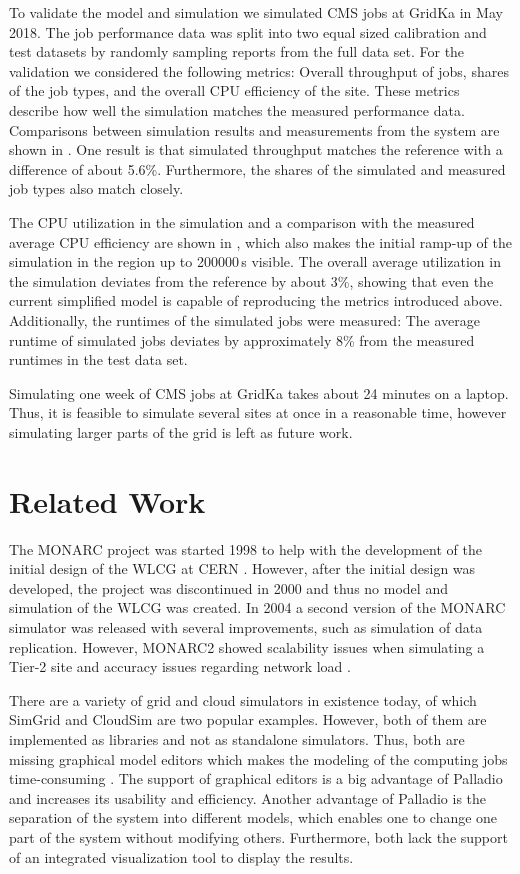 \documentclass{webofc}
\begin{document}
\vspace{10px}
\noindent To validate the model and simulation we simulated CMS jobs at GridKa in May 2018.
The job performance data was split into two equal sized calibration and test datasets by randomly sampling reports from the full data set.
For the validation we considered the following metrics: Overall throughput of jobs, shares of the job types, and the overall CPU efficiency of the site.
These metrics describe how well the simulation matches the measured performance data.
Comparisons between simulation results and measurements from the system are shown in .
One result is that simulated throughput matches the reference with a difference of about 5.6\%.
Furthermore, the shares of the simulated and measured job types also match closely.

The CPU utilization in the simulation and a comparison with the measured average CPU efficiency are shown in , which also makes the initial ramp-up of the simulation in the region up to 200000\,s visible.
The overall average utilization in the simulation deviates from the reference by about 3\%, showing that even the current simplified model is capable of reproducing the metrics introduced above.
Additionally, the runtimes of the simulated jobs were measured: The average runtime of simulated jobs deviates by approximately 8\% from the measured runtimes in the test data set.

Simulating one week of CMS jobs at GridKa takes about 24 minutes on a laptop.
Thus, it is feasible to simulate several sites at once in a reasonable time, however simulating larger parts of the grid is left as future work.

\section{Related Work}
\label{related}
The MONARC project was started 1998 to help with the development of the initial design of the WLCG at CERN \cite{monarc2000models}.
However, after the initial design was developed, the project was discontinued in 2000 and thus no model and simulation of the WLCG was created. 
In 2004 a second version of the MONARC simulator was released with several improvements, such as simulation of data replication. However, MONARC2 showed scalability issues when simulating a Tier-2 site and accuracy issues regarding network load \cite{1742-6596-331-7-072038}.

There are a variety of grid and cloud simulators in existence today, of which SimGrid and CloudSim are two popular examples. 
However, both of them are implemented as libraries and not as standalone simulators. Thus, both are missing graphical model editors which makes the modeling of the computing jobs time-consuming \cite{simgrid,cloudsim}. The support of graphical editors is a big advantage of Palladio and increases its usability and efficiency. Another advantage of Palladio is the separation of the system into different models, which enables one to change one part of the system without modifying others. Furthermore, both lack the support of an integrated visualization tool to display the results.  
\end{document}
